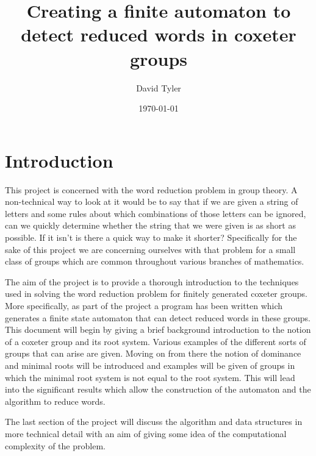 \documentclass[a4paper,12pt]{article}
\title{Creating a finite automaton to detect reduced words in coxeter groups}
\author{David Tyler}
\date{\today}
\begin{document}
\maketitle
\newpage

\setcounter{tocdepth}{1}
\tableofcontents
\newpage

\newtheorem{thm}{Theorem}[section]
\newtheorem{prop}[thm]{Proposition}
\newtheorem{cor}[thm]{Corollary}
\newtheorem{lem}[thm]{Lemma}
\newtheorem{example}[thm]{Example}

\theoremstyle{definition}
\newtheorem{definition}[thm]{Definition}

\section{Introduction}
This project is concerned with the word reduction problem in group theory. A non-technical way to look at it would be to say that if we are given a string of letters and some rules about which combinations of those letters can be ignored, can we quickly determine whether the string that we were given is as short as possible. If it isn't is there a quick way to make it shorter? Specifically for the sake of this project we are concerning ourselves with that problem for a small class of groups which are common throughout various branches of mathematics.

The aim of the project is to provide a thorough introduction to the techniques used in solving the word reduction problem for finitely generated coxeter groups. More specifically, as part of the project a program has been written which generates a finite state automaton that can detect reduced words in these groups. This document will begin by giving a brief background introduction to the notion of a coxeter group and its root system. Various examples of the different sorts of groups that can arise are given. Moving on from there the notion of dominance and minimal roots will be introduced and examples will be given of groups in which the minimal root system is not equal to the root system. This will lead into the significant results which allow the construction of the automaton and the algorithm to reduce words.

The last section of the project will discuss the algorithm and data structures in more technical detail with an aim of giving some idea of the computational complexity of the problem.
\end{document}
